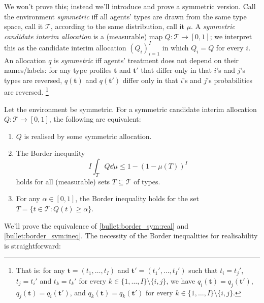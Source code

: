 We won't prove this; instead we'll introduce and prove a symmetric version.
Call the environment \emph{symmetric} iff all agents' types are drawn from the same type space, call it $\mathcal{T}$,
according to the same distribution, call it $\mu$.
A \emph{symmetric candidate interim allocation} is a (measurable) map $Q : \mathcal{T} \to [0,1]$;
we interpret this as the candidate interim allocation $(Q_i)_{i=1}^I$ in which $Q_i = Q$ for every $i$.
An allocation $q$ is \emph{symmetric} iff agents' treatment does not depend on their names/labels:
for any type profiles $\boldsymbol{t}$ and $\boldsymbol{t'}$ that differ only in that $i$'s and $j$'s types are reversed, $q(\boldsymbol{t})$ and $q(\boldsymbol{t'})$ differ only in that $i$'s and $j$'s probabilities are reversed.%
	\footnote{That is: for any $\boldsymbol{t} = (t_1,\dots,t_I)$ and $\boldsymbol{t'} = (t_1',\dots,t_I')$ such that $t_i = t_j'$, $t_j = t_i'$ and $t_k = t_k'$ for every $k \in \{1,\dots,I\} \setminus \{i,j\}$, we have $q_i(\boldsymbol{t}) = q_j(\boldsymbol{t'})$, $q_j(\boldsymbol{t}) = q_i(\boldsymbol{t'})$, and $q_k(\boldsymbol{t}) = q_k(\boldsymbol{t'})$ for every $k \in \{1,\dots,I\} \setminus \{i,j\}$.}

\begin{namedthm}
	\label{theorem:border_sym}
	Let the environment be symmetric.
	For a symmetric candidate interim allocation $Q : \mathcal{T} \to [0,1]$,
	the following are equivalent:
	\begin{enumerate}
	
		\item \label{bullet:border_sym:real}
		$Q$ is realised by some symmetric allocation.

		\item \label{bullet:border_sym:ineq}
		The Border inequality
		\begin{equation*}
			I \int_T Q \dd \mu
			\leq 1 - \left( 1 - \mu(T) \right)^I
		\end{equation*}
		holds for all (measurable) sets $T \subseteq \mathcal{T}$ of types.

		\item \label{bullet:border_sym:alpha}
		For any $\alpha \in [0,1]$,
		the Border inequality holds for the set $T = \{ t \in \mathcal{T} : Q(t) \geq \alpha \}$.
	
	\end{enumerate}
\end{namedthm}

We'll prove the equivalence of \ref{bullet:border_sym:real} and \ref{bullet:border_sym:ineq}.
The necessity of the Border inequalities for realisability is straightforward:

